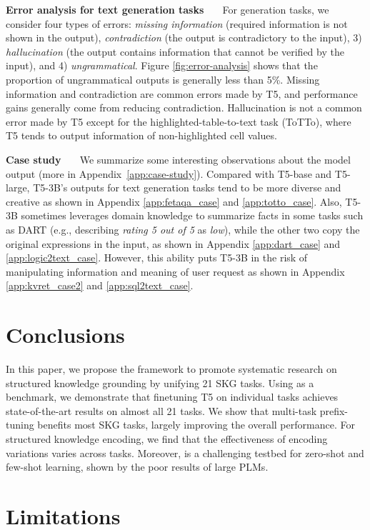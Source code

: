 \documentclass[11pt]{article}
\newcommand{\skg}{SKG\xspace}
\newcommand{\ntasks}{21\xspace}
\begin{document}
\noindent\textbf{Error analysis for text generation tasks \ \ } 
For generation tasks, we consider four types of errors: \textit{missing information} (required information is not shown in the output), \textit{contradiction} (the output is contradictory to the input), 3) \textit{hallucination} (the output contains information that cannot be verified by the input), and 4) \textit{ungrammatical}. 
Figure \ref{fig:error-analysis} shows that the proportion of ungrammatical outputs is generally less than 5\%. 
Missing information and contradiction are common errors made by T5, and performance gains generally come from reducing contradiction. 
Hallucination is not a common error made by T5 except for the highlighted-table-to-text task (ToTTo), where T5 tends to output information of non-highlighted cell values.


\noindent\textbf{Case study \ \ }
We summarize some interesting observations about the model output (more in Appendix~\ref{app:case-study}).
Compared with T5-base and T5-large, T5-3B's outputs for text generation tasks tend to be more diverse and creative as shown in Appendix \ref{app:fetaqa_case} and \ref{app:totto_case}.
Also, T5-3B sometimes leverages domain knowledge to summarize facts in some tasks such as DART (e.g., describing \textit{rating 5 out of 5} as \textit{low}), while the other two copy the original expressions in the input, as shown in Appendix \ref{app:dart_case} and \ref{app:logic2text_case}.
However, this ability puts T5-3B in the risk of manipulating information and meaning of user request as shown in Appendix \ref{app:kvret_case2} and \ref{app:sql2text_case}. 
 
\section{Conclusions}
In this paper, we propose the \uskg framework to promote systematic research on structured knowledge grounding by unifying \ntasks \skg tasks. Using \uskg as a benchmark, we demonstrate that finetuning T5 on individual tasks achieves state-of-the-art results on almost all \ntasks tasks. 
We show that multi-task prefix-tuning benefits most \skg tasks, largely improving the overall performance. 
For structured knowledge encoding, we find that the effectiveness of encoding variations varies across tasks. 
Moreover, \uskg is a challenging testbed for zero-shot and few-shot learning, shown by the poor results of large PLMs. 

\section{Limitations}
\end{document}

